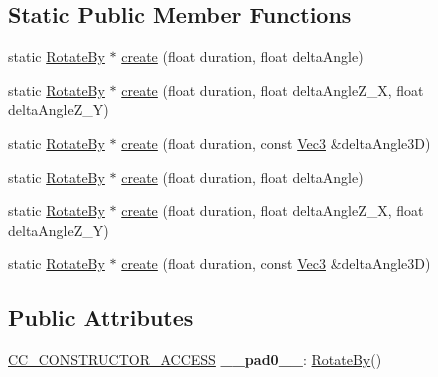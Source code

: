 \subsection*{Static Public Member Functions}
\begin{DoxyCompactItemize}
\item 
static \hyperlink{classRotateBy}{Rotate\+By} $\ast$ \hyperlink{classRotateBy_af69a17d58dcae01e7c9186cc66a992c5}{create} (float duration, float delta\+Angle)
\item 
static \hyperlink{classRotateBy}{Rotate\+By} $\ast$ \hyperlink{classRotateBy_a71ac0001ee6219e749d6d21e631f6fa3}{create} (float duration, float delta\+Angle\+Z\+\_\+X, float delta\+Angle\+Z\+\_\+Y)
\item 
static \hyperlink{classRotateBy}{Rotate\+By} $\ast$ \hyperlink{classRotateBy_ab609631dbf7665fc3c1c93f9c8bf486b}{create} (float duration, const \hyperlink{classVec3}{Vec3} \&delta\+Angle3D)
\item 
static \hyperlink{classRotateBy}{Rotate\+By} $\ast$ \hyperlink{classRotateBy_a02ff87da50beb34e1da4b3f59dd69b6c}{create} (float duration, float delta\+Angle)
\item 
static \hyperlink{classRotateBy}{Rotate\+By} $\ast$ \hyperlink{classRotateBy_a019bdfa51bcaa01d1ffba49d3b5f7ed1}{create} (float duration, float delta\+Angle\+Z\+\_\+X, float delta\+Angle\+Z\+\_\+Y)
\item 
static \hyperlink{classRotateBy}{Rotate\+By} $\ast$ \hyperlink{classRotateBy_a45070cbbc950f9ce732571d558d0e916}{create} (float duration, const \hyperlink{classVec3}{Vec3} \&delta\+Angle3D)
\end{DoxyCompactItemize}
\subsection*{Public Attributes}
\begin{DoxyCompactItemize}
\item 
\mbox{\label{classRotateBy_a0c182d91fe16c962d0efd70e3f885b02}} 
\hyperlink{_2cocos2d_2cocos_2base_2ccConfig_8h_a25ef1314f97c35a2ed3d029b0ead6da0}{C\+C\+\_\+\+C\+O\+N\+S\+T\+R\+U\+C\+T\+O\+R\+\_\+\+A\+C\+C\+E\+SS} {\bfseries \+\_\+\+\_\+pad0\+\_\+\+\_\+}\+: \hyperlink{classRotateBy}{Rotate\+By}()
\end{DoxyCompactItemize}
